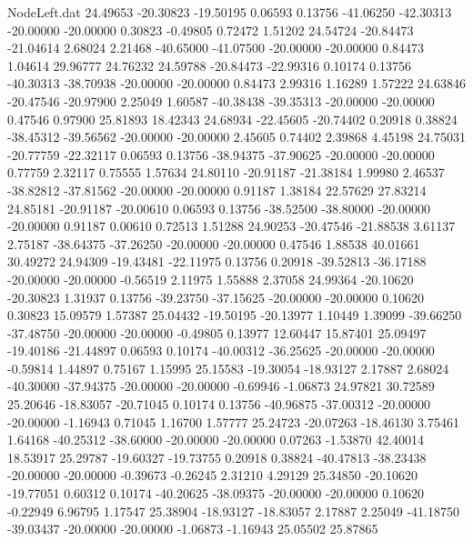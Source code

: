 \begin{filecontents}{NodeLeft.dat}
  24.49653  -20.30823  -19.50195     0.06593    0.13756  -41.06250  -42.30313  -20.00000  -20.00000    0.30823   -0.49805    0.72472    1.51202
  24.54724  -20.84473  -21.04614     2.68024    2.21468  -40.65000  -41.07500  -20.00000  -20.00000    0.84473    1.04614   29.96777   24.76232
  24.59788  -20.84473  -22.99316     0.10174    0.13756  -40.30313  -38.70938  -20.00000  -20.00000    0.84473    2.99316    1.16289    1.57222
  24.63846  -20.47546  -20.97900     2.25049    1.60587  -40.38438  -39.35313  -20.00000  -20.00000    0.47546    0.97900   25.81893   18.42343
  24.68934  -22.45605  -20.74402     0.20918    0.38824  -38.45312  -39.56562  -20.00000  -20.00000    2.45605    0.74402    2.39868    4.45198
  24.75031  -20.77759  -22.32117     0.06593    0.13756  -38.94375  -37.90625  -20.00000  -20.00000    0.77759    2.32117    0.75555    1.57634
  24.80110  -20.91187  -21.38184     1.99980    2.46537  -38.82812  -37.81562  -20.00000  -20.00000    0.91187    1.38184   22.57629   27.83214
  24.85181  -20.91187  -20.00610     0.06593    0.13756  -38.52500  -38.80000  -20.00000  -20.00000    0.91187    0.00610    0.72513    1.51288
  24.90253  -20.47546  -21.88538     3.61137    2.75187  -38.64375  -37.26250  -20.00000  -20.00000    0.47546    1.88538   40.01661   30.49272
  24.94309  -19.43481  -22.11975     0.13756    0.20918  -39.52813  -36.17188  -20.00000  -20.00000   -0.56519    2.11975    1.55888    2.37058
  24.99364  -20.10620  -20.30823     1.31937    0.13756  -39.23750  -37.15625  -20.00000  -20.00000    0.10620    0.30823   15.09579    1.57387
  25.04432  -19.50195  -20.13977     1.10449    1.39099  -39.66250  -37.48750  -20.00000  -20.00000   -0.49805    0.13977   12.60447   15.87401
  25.09497  -19.40186  -21.44897     0.06593    0.10174  -40.00312  -36.25625  -20.00000  -20.00000   -0.59814    1.44897    0.75167    1.15995
  25.15583  -19.30054  -18.93127     2.17887    2.68024  -40.30000  -37.94375  -20.00000  -20.00000   -0.69946   -1.06873   24.97821   30.72589
  25.20646  -18.83057  -20.71045     0.10174    0.13756  -40.96875  -37.00312  -20.00000  -20.00000   -1.16943    0.71045    1.16700    1.57777
  25.24723  -20.07263  -18.46130     3.75461    1.64168  -40.25312  -38.60000  -20.00000  -20.00000    0.07263   -1.53870   42.40014   18.53917
  25.29787  -19.60327  -19.73755     0.20918    0.38824  -40.47813  -38.23438  -20.00000  -20.00000   -0.39673   -0.26245    2.31210    4.29129
  25.34850  -20.10620  -19.77051     0.60312    0.10174  -40.20625  -38.09375  -20.00000  -20.00000    0.10620   -0.22949    6.96795    1.17547
  25.38904  -18.93127  -18.83057     2.17887    2.25049  -41.18750  -39.03437  -20.00000  -20.00000   -1.06873   -1.16943   25.05502   25.87865

\end{filecontents}
